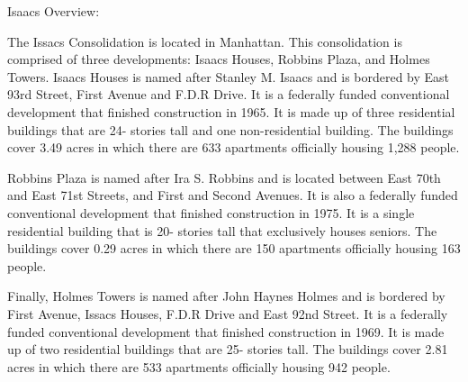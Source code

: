 Isaacs Overview:      

    

The Issacs Consolidation is located in Manhattan. This consolidation is comprised of three developments: Isaacs Houses, Robbins Plaza, and Holmes Towers. Isaacs Houses is named after Stanley M. Isaacs and is bordered by East 93rd Street, First Avenue and F.D.R Drive. It is a federally funded conventional development that finished construction in 1965. It is made up of three residential buildings that are 24- stories tall and one non-residential building. The buildings cover 3.49 acres in which there are 633 apartments officially housing 1,288 people.  



Robbins Plaza is named after Ira S. Robbins and is located between East 70th and East 71st Streets, and First and Second Avenues. It is also a federally funded conventional development that finished construction in 1975. It is a single residential building that is 20- stories tall that exclusively houses seniors. The buildings cover 0.29 acres in which there are 150 apartments officially housing 163 people.  



Finally, Holmes Towers is named after John Haynes Holmes and is bordered by First Avenue, Issacs Houses, F.D.R Drive and East 92nd Street. It is a federally funded conventional development that finished construction in 1969. It is made up of two residential buildings that are 25- stories tall. The buildings cover 2.81 acres in which there are 533 apartments officially housing 942 people.